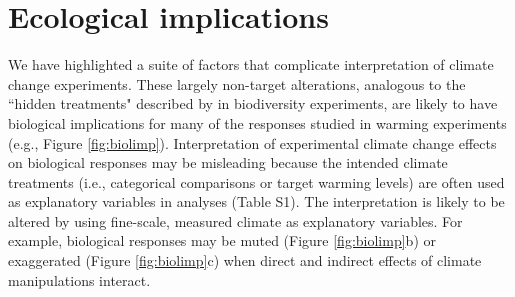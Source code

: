\documentclass{article}
\begin{document}
\section* {Ecological implications}

\par We have highlighted a suite of factors that complicate interpretation of climate change experiments. These largely non-target alterations, analogous to the ``hidden treatments" described by \citet{huston1997} in biodiversity experiments, are likely to have biological implications for many of the responses studied in warming experiments (e.g., Figure \ref{fig:biolimp}). Interpretation of experimental climate change effects on biological responses may be misleading because the intended climate treatments (i.e., categorical comparisons or target warming levels) are often used as explanatory variables in analyses (Table S1). The interpretation is likely to be altered by using fine-scale, measured climate as explanatory variables. For example, biological responses may be muted (Figure \ref{fig:biolimp}b) or exaggerated (Figure \ref{fig:biolimp}c) when direct and indirect effects of climate manipulations interact.
\end{document}
